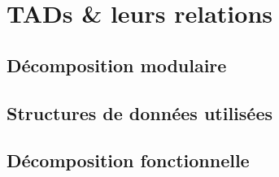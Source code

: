 \section{TADs \& leurs relations}
\subsection{Décomposition modulaire}

\bframes{
  
}

\bframes{
 
}

\bframes{
    
}


%

\subsection{Structures de données utilisées}

%
%
\subsection{Décomposition fonctionnelle}
\bframes{
    
}
